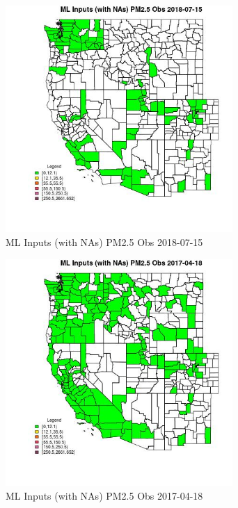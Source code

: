 \begin{figure} 
\centering  
\includegraphics[width=0.77\textwidth]{Code_Outputs/Report_ML_input_PM25_Step4_part_e_de_duplicated_aves_compiled_2019-05-20wNAs_CountyPM25_ObsMean2018-07-15.jpg} 
\caption{\label{fig:Report_ML_input_PM25_Step4_part_e_de_duplicated_aves_compiled_2019-05-20wNAsCountyPM25_ObsMean2018-07-15}ML Inputs (with NAs) PM2.5 Obs 2018-07-15} 
\end{figure} 
 

\begin{figure} 
\centering  
\includegraphics[width=0.77\textwidth]{Code_Outputs/Report_ML_input_PM25_Step4_part_e_de_duplicated_aves_compiled_2019-05-20wNAs_CountyPM25_ObsMean2017-04-18.jpg} 
\caption{\label{fig:Report_ML_input_PM25_Step4_part_e_de_duplicated_aves_compiled_2019-05-20wNAsCountyPM25_ObsMean2017-04-18}ML Inputs (with NAs) PM2.5 Obs 2017-04-18} 
\end{figure} 
 

